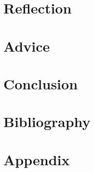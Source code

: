 \documentclass{article}
\begin{document}
\newpage
\section{Reflection}

\newpage
\section{Advice}

\newpage
\section{Conclusion}

\newpage
\section{Bibliography}

\newpage
\section{Appendix}
\end{document}
